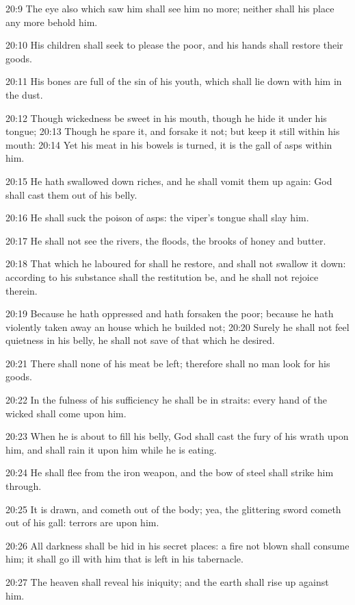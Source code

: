 20:9 The eye also which saw him shall see him no more; neither shall his place any more behold him.

20:10 His children shall seek to please the poor, and his hands shall restore their goods.

20:11 His bones are full of the sin of his youth, which shall lie down with him in the dust.

20:12 Though wickedness be sweet in his mouth, though he hide it under his tongue; 20:13 Though he spare it, and forsake it not; but keep it still within his mouth: 20:14 Yet his meat in his bowels is turned, it is the gall of asps within him.

20:15 He hath swallowed down riches, and he shall vomit them up again: God shall cast them out of his belly.

20:16 He shall suck the poison of asps: the viper's tongue shall slay him.

20:17 He shall not see the rivers, the floods, the brooks of honey and butter.

20:18 That which he laboured for shall he restore, and shall not swallow it down: according to his substance shall the restitution be, and he shall not rejoice therein.

20:19 Because he hath oppressed and hath forsaken the poor; because he hath violently taken away an house which he builded not; 20:20 Surely he shall not feel quietness in his belly, he shall not save of that which he desired.

20:21 There shall none of his meat be left; therefore shall no man look for his goods.

20:22 In the fulness of his sufficiency he shall be in straits: every hand of the wicked shall come upon him.

20:23 When he is about to fill his belly, God shall cast the fury of his wrath upon him, and shall rain it upon him while he is eating.

20:24 He shall flee from the iron weapon, and the bow of steel shall strike him through.

20:25 It is drawn, and cometh out of the body; yea, the glittering sword cometh out of his gall: terrors are upon him.

20:26 All darkness shall be hid in his secret places: a fire not blown shall consume him; it shall go ill with him that is left in his tabernacle.

20:27 The heaven shall reveal his iniquity; and the earth shall rise up against him.

